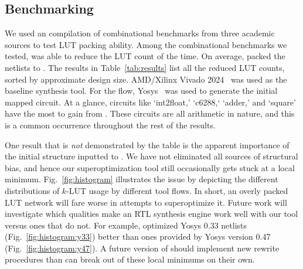 \subsection{Benchmarking}\label{sec:results:benchmark}

We used an compilation of \nbenchmarks{} combinational benchmarks from three
academic sources to test LUT packing ability. Among the combinational
benchmarks we tested, \shortname{} was able to reduce the LUT count \fmetric{}
of the time. On average, \shortname{} packed the netlists to \metric{}. The
results in Table~\ref{tab:results} list all the reduced LUT counts, sorted by
approximate design size. AMD/Xilinx Vivado 2024~\cite{vivado} was used as the
baseline synthesis tool. For the \shortname{} flow, Yosys~\cite{yosys} was used
to generate the initial mapped circuit. At a glance, circuits like `int2float,'
`c6288,` `adder,' and `square' have the most to gain from \shortname{}. These
circuits are all arithmetic in nature, and this is a common occurrence
throughout the rest of the results.

One result that is \textit{not} demonstrated by the table is the apparent
importance of the initial structure inputted to \shortname{}. We have not
eliminated all sources of structural bias, and hence our superoptimization tool
still occasionally gets stuck at a local minimum. Fig.~\ref{fig:histogram}
illustrates the issue by depicting the different distributions of $k$-LUT usage
by different tool flows. In short, an overly packed LUT network will fare worse
in attempts to superoptimize it. Future work will investigate which qualities
make an RTL synthesis engine work well with our tool versus ones that do not.
For example, \shortname{} optimized Yosys 0.33 netlists
(Fig.~\ref{fig:histogram:y33}) better than ones provided by Yosys version 0.47
(Fig.~\ref{fig:histogram:y47}). A future version of \shortname{} should
implement new rewrite procedures than can break out of these local minimums on
their own.

